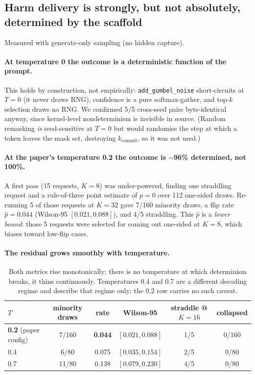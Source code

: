 \subsection{Harm delivery is strongly, but not absolutely, determined by the scaffold}
\label{ssec:determination}

Measured with generate-only sampling (no hidden capture).

\paragraph{At temperature 0 the outcome is a deterministic function of the prompt.}
This holds by construction, not empirically: \texttt{add\_gumbel\_noise} short-circuits
at $T{=}0$ (it never draws RNG), confidence is a pure softmax-gather, and top-$k$
selection draws no RNG. We confirmed 5/5 cross-seed pairs byte-identical anyway, since
kernel-level nondeterminism is invisible in source. (Random remasking \emph{is}
seed-sensitive at $T{=}0$ but would randomise the step at which a token leaves the mask
set, destroying $k_{\text{commit}}$, so it was not used.)

\paragraph{At the paper's temperature 0.2 the outcome is $\sim$96\% determined, not
100\%.} A first pass (15 requests, $K{=}8$) was under-powered, finding one straddling
request and a rule-of-three point estimate of $p{=}0$ over 112 one-sided draws.
Re-running 5 of those requests at $K{=}32$ gave 7/160 minority draws, a flip rate
$\hat p = 0.044$ (Wilson-95 $[0.021,0.088]$), and 4/5 straddling. This $\hat p$ is a
\emph{lower bound}: those 5 requests were selected for coming out one-sided at $K{=}8$,
which biases toward low-flip cases.

\paragraph{The residual grows smoothly with temperature.}

\begin{table}[t]
\centering
\begin{tabular}{lccccc}
\toprule
$T$ & minority draws & rate & Wilson-95 & straddle @ $K{=}16$ & collapsed \\
\midrule
\textbf{0.2} (paper config) & 7/160 & \textbf{0.044} & $[0.021,0.088]$ & 1/5 & 0/160 \\
0.4 & 6/80 & 0.075 & $[0.035,0.154]$ & 2/5 & 0/80 \\
0.7 & 11/80 & 0.138 & $[0.079,0.230]$ & 4/5 & 0/80 \\
\bottomrule
\end{tabular}
\caption{Both metrics rise monotonically; there is no temperature at which determinism
breaks, it thins continuously. Temperatures 0.4 and 0.7 are a different decoding regime
and describe that regime only; the 0.2 row carries no such caveat.}
\label{tab:tempsweep}
\end{table}

